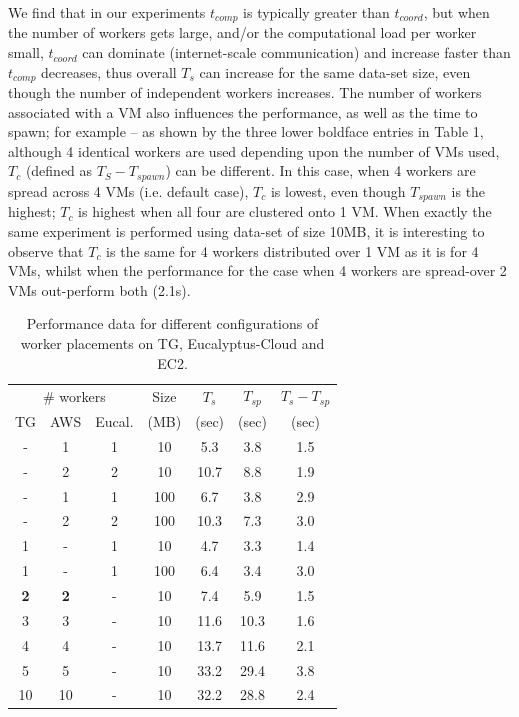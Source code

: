 \documentclass[3p,twocolumn]{elsarticle}
\begin{document}
We find that in our experiments $t_{comp}$ is typically greater than
$t_{coord}$, but when the number of workers gets large, and/or the
computational load per worker small, $t_{coord}$ can dominate
(internet-scale communication) and increase faster than $t_{comp}$
decreases, thus overall $T_s$ can increase for the same data-set size,
even though the number of independent workers increases.  The number
of workers associated with a VM also influences the performance, as
well as the time to spawn; for example -- as shown by the three lower
boldface entries in Table 1, although 4 identical workers are used
depending upon the number of VMs used, $T_c$ (defined as $T_S -
T_{spawn} $) can be different.  In this case, when 4 workers are
spread across 4 VMs (i.e. default case), $T_c$ is lowest, even though
$T_{spawn}$ is the highest; $T_c$ is highest when all four are
clustered onto 1 VM. When exactly the same experiment is performed
using data-set of size 10MB, it is interesting to observe that $T_c$
is the same for 4 workers distributed over 1 VM as it is for 4 VMs,
whilst when the performance for the case when  4 workers are
spread-over 2 VMs out-perform both (2.1s).

\begin{table}[h!]
  \footnotesize
  \begin{tabular}{ccccccc}
    \hline
    \multicolumn{3}{c}{\# workers}  &  Size   &  $T_s$  & $T_{sp}$ & $T_s - T_{sp}$\\   
    TG &  AWS & Eucal. &  (MB)  & (sec) & (sec) & (sec) \\
    \hline
    - & 1 & 1 & 10   & 5.3 & 3.8 & 1.5\\
    - & 2 & 2 & 10   & 10.7 & 8.8 & 1.9 \\
    - & 1 & 1 & 100  & 6.7 & 3.8 & 2.9\\
    - & 2 & 2 & 100  & 10.3 & 7.3 & 3.0\\
    \hline 
    1 & - & 1 & 10   & 4.7 & 3.3 & 1.4\\
    1 & - & 1 & 100  & 6.4 & 3.4 & 3.0\\
    \hline 
    {\bf 2} &   {\bf 2} & - & 10 & 7.4 & 5.9 & 1.5 \\
    3 & 3 & - & 10 & 11.6 & 10.3 & 1.6 \\
    4 & 4 & - & 10 & 13.7 & 11.6 & 2.1 \\
    5 & 5 & - & 10 & 33.2 & 29.4 & 3.8 \\ 
    10 & 10 & - & 10 & 32.2 & 28.8 & 2.4 \\
    \hline
     \hline 
  \end{tabular}
  \caption{Performance data for different configurations of worker
  placements on TG, Eucalyptus-Cloud and EC2. \uppp
  \label{tab:1b}}
\end{table}
\end{document}

